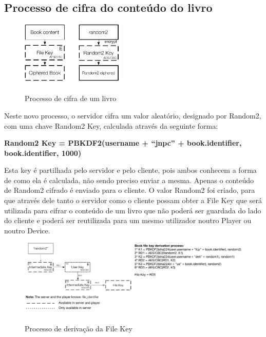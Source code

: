 \documentclass[pdftex,12pt,a4paper]{report}
\begin{document}
\subsection{Processo de cifra do conteúdo do livro}

\begin{figure}[!htb]
\center
 \includegraphics[width=50mm,scale=1]{book-cipher-process.pdf}
 \caption{\\Processo de cifra de um livro}\label{fig:eer}
\end{figure}

Neste novo processo, o servidor cifra um valor aleatório, designado por Random2, com uma chave Random2 Key, calculada através da seguinte forma:

\begin{center}
	\textbf{Random2 Key = PBKDF2(username + “jnpc” + book.identifier, book.identifier, 1000)}
\end{center}

Esta key é partilhada pelo servidor e pelo cliente, pois ambos conhecem a forma de como ela é calculada, não sendo preciso enviar a mesma. Apenas o conteúdo de Random2 cifrado é enviado para o cliente. 
O valor Random2 foi criado, para que através dele tanto o servidor como o cliente possam obter a File Key que será utilizada para cifrar o conteúdo de um livro que não poderá ser guardada do lado do cliente e poderá ser reutilizada para um mesmo utilizador noutro Player ou noutro Device.

\begin{figure}[!htb]
\center
 \includegraphics[width=150mm,scale=1]{file-key-generation.pdf}
 \caption{\\Processo de derivação da File Key}
 \label{fig:processo_de_derivacao_file_key}
\end{figure}
\end{document}
